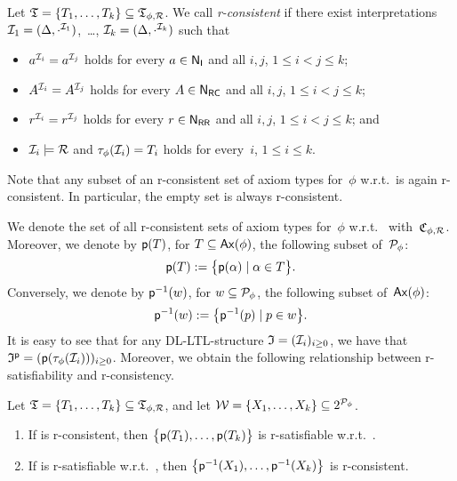 \begin{definition}[R-consistency]\label{def:r-cons}
    Let $\mathfrak{T}=\{T_1,\dots,T_k\}\subseteq\mathfrak{T}_{\phi,\mathcal{R}}$.  We call \Tmf
    \emph{r-consistent} if there exist interpretations
    $\mathcal{I}_1=(\Delta,\cdot^{\mathcal{I}_1})$,~\dots, $\mathcal{I}_k=(\Delta,\cdot^{\mathcal{I}_k})$
    such that
    \begin{itemize}
        \item $a^{\mathcal{I}_i}=a^{\mathcal{I}_j}$ holds for every $a\in\mathsf{N_I}$ and all $i,j$,
            $1\le i<j\le k$;
        \item $A^{\mathcal{I}_i}=A^{\mathcal{I}_j}$ holds for every $A\in\mathsf{N_{RC}}$ and all $i,j$,
            $1\le i<j\le k$;
        \item $r^{\mathcal{I}_i}=r^{\mathcal{I}_j}$ holds for every $r\in\mathsf{N_{RR}}$ and all $i,j$,
            $1\le i<j\le k$; and
        \item $\mathcal{I}_i\models\mathcal{R}$ and $\tau_\phi(\mathcal{I}_i)=T_i$ holds for
            every~$i$, $1\le i\le k$.
    \end{itemize}
\end{definition}

\noindent
Note that any subset of an r-consistent set of axiom types for~$\phi$
w.r.t.~\Rmc is again r-consistent.  In particular, the empty set is always
r-consistent.

We denote the set of all r-consistent sets of axiom types for~$\phi$ w.r.t.~\Rmc
with~$\mathfrak{C}_{\phi,\mathcal{R}}$.
%
Moreover, we denote by $\mathsf{p}(T)$, for $T\subseteq\operatorname{\mathsf{Ax}}(\phi)$, the following
subset of~$\mathcal{P}_\phi$:
\[\mathsf{p}(T):=\bigl\{\mathsf{p}(\alpha)\mid\alpha\in T\bigr\}.\]
Conversely, we denote by $\mathsf{p}^{-1}(w)$, for $w\subseteq\mathcal{P}_\phi$, the
following subset of~$\operatorname{\mathsf{Ax}}(\phi)$:
\[\mathsf{p}^{-1}(w):=\bigl\{\mathsf{p}^{-1}(p)\mid p\in w\bigr\}.\]
%
It is easy to see that for any DL-LTL-structure $\mathfrak{I}=(\mathcal{I}_i)_{i\ge 0}$, we
have that $\mathfrak{I}^\mathsf{p}=(\mathsf{p}(\tau_\phi(\mathcal{I}_i)))_{i\ge 0}$.
%
Moreover, we obtain the following relationship between r-satisfiability and
r-consistency.

\begin{lemma}\label{lem:r-cons-r-sat}
    Let $\mathfrak{T}=\{T_1,\dots,T_k\}\subseteq\mathfrak{T}_{\phi,\mathcal{R}}$, and let
    $\mathcal{W}=\{X_1,\dots,X_k\}\subseteq 2^{\mathcal{P}_\phi}$.
    \begin{enumerate}
        \item If \Tmf is r-consistent, then
            $\bigl\{\mathsf{p}(T_1),\dots,\mathsf{p}(T_k)\bigr\}$ is r-satisfiable
            w.r.t.~\Rmc.
        \item If \Wmc is r-satisfiable w.r.t.~\Rmc, then
            $\bigl\{\mathsf{p}^{-1}(X_1),\dots,\mathsf{p}^{-1}(X_k)\bigr\}$ is r-consistent.
    \end{enumerate}
\end{lemma}

